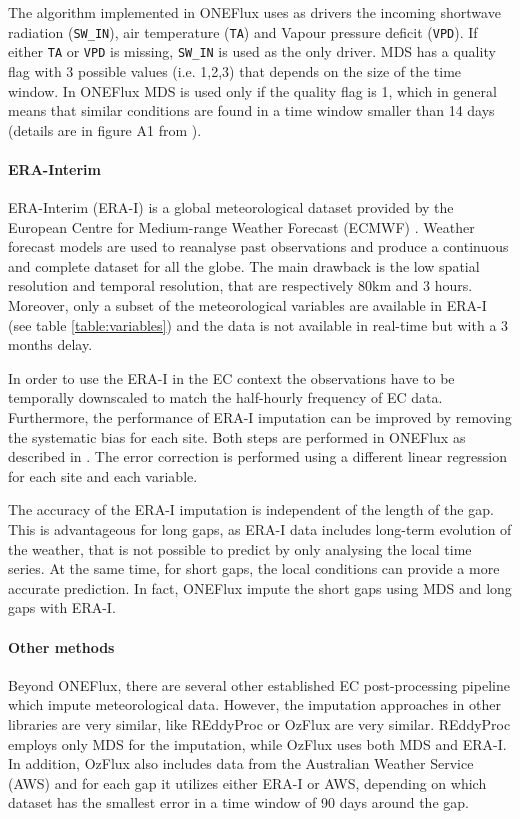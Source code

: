 \documentclass{article}
\begin{document}
The algorithm implemented in ONEFlux uses as drivers the incoming shortwave radiation (\texttt{SW\_IN}), air temperature (\texttt{TA}) and Vapour pressure deficit (\texttt{VPD}). If either \texttt{TA} or \texttt{VPD} is missing, \texttt{SW\_IN} is used as the only driver. 
MDS has a quality flag with 3 possible values (i.e. 1,2,3) that depends on the size of the time window. In ONEFlux MDS is used only if the quality flag is 1, which in general means that similar conditions are found in a time window smaller than 14 days (details are in figure A1 from  \cite{reichstein_separation_2005-3}). 

\paragraph{ERA-Interim} ERA-Interim (ERA-I) is a global meteorological dataset provided by the European Centre for Medium-range Weather Forecast (ECMWF) \cite{dee_era-interim_2011}. Weather forecast models are used to reanalyse past observations and produce a continuous and complete dataset for all the globe. The main drawback is the low spatial resolution and temporal resolution, that are respectively 80km and 3 hours. Moreover, only a subset of the meteorological variables are available in ERA-I (see table \ref{table:variables}) and the data is not available in real-time but with a 3 months delay.

In order to use the ERA-I in the EC context the observations have to be temporally downscaled to match the half-hourly frequency of EC data. Furthermore, the performance of ERA-I imputation can be improved by removing the systematic bias for each site. Both steps are performed in ONEFlux as described in \cite{vuichard_filling_2015}. The error correction is performed using a different linear regression for each site and each variable.

The accuracy of the ERA-I imputation is independent of the length of the gap. This is advantageous for long gaps, as ERA-I data includes long-term evolution of the weather, that is not possible to predict by only analysing the local time series. At the same time, for short gaps, the local conditions can provide a more  accurate prediction.
In fact, ONEFlux impute the short gaps using MDS and long gaps with ERA-I.

\paragraph{Other methods} Beyond ONEFlux, there are several other established EC post-processing pipeline which impute meteorological data. However, the imputation approaches in other libraries are very similar, like REddyProc \cite{wutzler_basic_2018} or OzFlux \cite{isaac_ozflux_2017} are very similar. REddyProc employs only MDS for the imputation, while OzFlux uses both MDS and ERA-I. In addition, OzFlux also includes data from the Australian Weather Service (AWS) and for each gap it utilizes either ERA-I or AWS, depending on which dataset has the smallest error in a time window of 90 days around the gap.
\pagebreak
\end{document}
